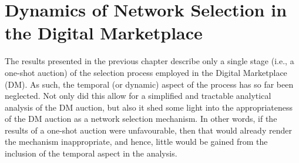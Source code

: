 \chapter{Dynamics of Network Selection in the Digital Marketplace} %
\label{cha:dynamics_of_network_selection_in_the_digital_marketplace}

\minitoc
\vspace{10mm}

The results presented in the previous chapter describe only a single stage (i.e., a one-shot auction) of the selection process employed in the Digital Marketplace (DM). As such, the temporal (or dynamic) aspect of the process has so far been neglected. Not only did this allow for a simplified and tractable analytical analysis of the DM auction, but also it shed some light into the appropriateness of the DM auction as a network selection mechanism. In other words, if the results of a one-shot auction were unfavourable, then that would already render the mechanism inappropriate, and hence, little would be gained from the inclusion of the temporal aspect in the analysis.

